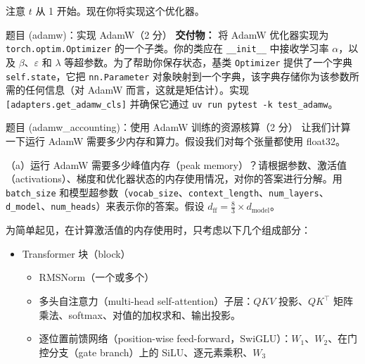注意 $t$ 从 1 开始。现在你将实现这个优化器。

\begin{problembox}{题目 (adamw)：实现 AdamW（2 分）}
\textbf{交付物：} 将 AdamW 优化器实现为 \texttt{torch.optim.Optimizer} 的一个子类。你的类应在 \texttt{\_\_init\_\_} 中接收学习率 $\alpha$，以及 $\beta$、$\varepsilon$ 和 $\lambda$ 等超参数。为了帮助你保存状态，基类 \texttt{Optimizer} 提供了一个字典 \texttt{self.state}，它把 \texttt{nn.Parameter} 对象映射到一个字典，该字典存储你为该参数所需的任何信息（对 AdamW 而言，这就是矩估计）。实现 \texttt{[adapters.get\_adamw\_cls]} 并确保它通过 \texttt{uv run pytest -k test\_adamw}。
\end{problembox}

\begin{problembox}{题目 (adamw\_accounting)：使用 AdamW 训练的资源核算（2 分）}
让我们计算一下运行 AdamW 需要多少内存和算力。假设我们对每个张量都使用 float32。

\medskip
（a）运行 AdamW 需要多少峰值内存（peak memory）？请根据参数、激活值（activations）、梯度和优化器状态的内存使用情况，对你的答案进行分解。用 \texttt{batch\_size} 和模型超参数（\texttt{vocab\_size}、\texttt{context\_length}、\texttt{num\_layers}、\texttt{d\_model}、\texttt{num\_heads}）来表示你的答案。假设 $d_{\text{ff}} = \tfrac{8}{3} \times d_{\text{model}}$。

\smallskip
为简单起见，在计算激活值的内存使用时，只考虑以下几个组成部分：
\begin{itemize}
  \item Transformer 块（block）
  \begin{itemize}
    \item RMSNorm（一个或多个）
    \item 多头自注意力（multi-head self-attention）子层：$QKV$ 投影、$QK^\top$ 矩阵乘法、softmax、对值的加权求和、输出投影。
    \item 逐位置前馈网络（position-wise feed-forward，SwiGLU）：$W_1$、$W_2$、在门控分支（gate branch）上的 SiLU、逐元素乘积、$W_3$
  \end{itemize}
\end{itemize}
\end{problembox}
